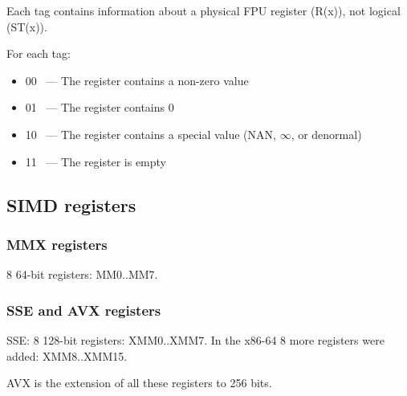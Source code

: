 Each tag contains information about a physical FPU register (R(x)), not logical (ST(x)).

For each tag:

\begin{itemize}
\item 00 ~--- The register contains a non-zero value
\item 01 ~--- The register contains 0
\item 10 ~--- The register contains a special value (\ac{NAN}, $\infty$, or denormal)
\item 11 ~--- The register is empty
\end{itemize}

\subsection{SIMD registers}

\subsubsection{MMX registers}

8 64-bit registers: MM0..MM7.

\subsubsection{SSE and AVX registers}

SSE: 8 128-bit registers: XMM0..XMM7.
In the x86-64 8 more registers were added: XMM8..XMM15.

AVX is the extension of all these registers to 256 bits.



